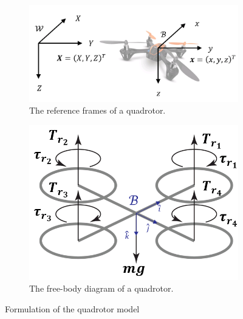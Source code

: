 \documentclass[journal,11pt,onecolumn,draftclsnofoot,]{IEEEtran}
\begin{document}
\begin{figure}
	\centering
	\begin{subfigure}[b]{.45\columnwidth}
		\centering
		\includegraphics[width=\columnwidth]{frames_quadrotor}
		\caption{The reference frames of a quadrotor.}
		\label{fig:frames}
	\end{subfigure}%
	\hfill
	\begin{subfigure}[b]{.45\columnwidth}
		\centering
		\includegraphics[width=\columnwidth]{FBD_quadrotor}
		\caption{The free-body diagram of a quadrotor.}
		\label{fig:FBD}
	\end{subfigure}
	\caption{Formulation of the quadrotor model}
	\label{fig:formulation_quadrotor}
\end{figure}
\end{document}
